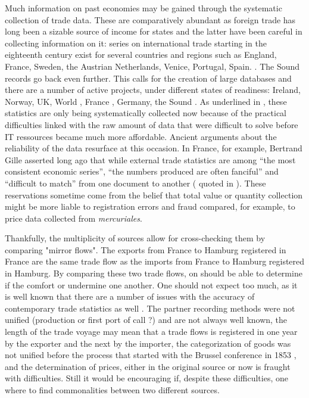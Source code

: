 \documentclass[12pt,a4paper,titlepage,english]{article}
\begin{document}
Much information on past economies may be gained through the systematic collection of trade data.
These are comparatively abundant as foreign trade has long been a sizable source of income for states and the latter have been careful in collecting information on it: series on international trade starting in the eighteenth century exist for several countries and regions such as England, France, Sweden, the Austrian Netherlands, Venice, Portugal, Spain. \cite{charles_eighteenth-century_2015}.
The Sound records go back even further.
This calls for the creation of large databases and there are a number of active projects, under different states of readiness: Ireland, Norway, UK, World \cite{dedinger_exploring_2017}, France \cite{daudin_toflit18_????}, Germany, the Sound \cite{gobel_sound_2010}.
As underlined in \cite{charles_eighteenth-century_2015}, these statistics are only being systematically collected now because of the practical difficulties linked with the raw amount of data that were difficult to solve before IT ressources became much more affordable.
Ancient arguments about the reliability of the data resurface at this occasion.
In France, for example, Bertrand Gille asserted long ago that while external trade statistics are among “the most consistent economic series”, “the numbers produced are often fanciful” and “difficult to match” from one document to another (\cite{gille_les_1964} quoted in  \cite{charles_eighteenth-century_2015}).
These reservations sometime come from the belief that  total value or quantity collection might be more liable to registration errors and fraud compared, for example, to price data collected from \emph{mercuriales}.

Thankfully, the multiplicity of sources allow for cross-checking them by comparing "mirror flows".
The exports from France to Hamburg registered in France are the same trade flow as the imports from France to Hamburg registered in Hamburg.
By comparing these two trade flows, on should be able to determine if the comfort or undermine one another.
One should not expect too much, as it is well known that there are a number of issues with the accuracy of contemporary trade statistics as well \cite{morgenstern_accuracy_1963,rozanski__1994}.
The partner recording methods were not unified  (production or first port of call ?) and are not always well known, the length of the trade voyage may mean that a trade flows is registered in one year by the exporter and the next by the importer, the categorization of goods was not unified before the process that started with the Brussel conference in 1853 \cite{escaith_past_2015}, and the determination of prices, either in the original source or now is fraught with difficulties.
Still it would be encouraging if, despite these difficulties, one where to find commonalities between two different sources.
\end{document}
